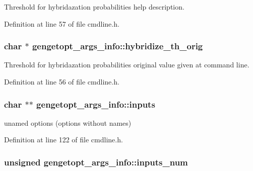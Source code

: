 Threshold for hybridazation probabilities help description. 



Definition at line 57 of file cmdline.\+h.

\hypertarget{structgengetopt__args__info_af5ad30ce558e2a362b45f25eac7c2d8a}{
\subsubsection[{hybridize\+\_\+th\+\_\+orig}]{\setlength{\rightskip}{0pt plus 5cm}char $\ast$ gengetopt\+\_\+args\+\_\+info\+::hybridize\+\_\+th\+\_\+orig}}\label{structgengetopt__args__info_af5ad30ce558e2a362b45f25eac7c2d8a}


Threshold for hybridazation probabilities original value given at command line. 



Definition at line 56 of file cmdline.\+h.

\hypertarget{structgengetopt__args__info_a6fe9c1a32bc4c64a2ca4e3cfce05b147}{
\subsubsection[{inputs}]{\setlength{\rightskip}{0pt plus 5cm}char $\ast$$\ast$ gengetopt\+\_\+args\+\_\+info\+::inputs}}\label{structgengetopt__args__info_a6fe9c1a32bc4c64a2ca4e3cfce05b147}


unamed options (options without names) 



Definition at line 122 of file cmdline.\+h.

\hypertarget{structgengetopt__args__info_a3d69c180d5ac0b1124fd9a6fe680706c}{
\subsubsection[{inputs\+\_\+num}]{\setlength{\rightskip}{0pt plus 5cm}unsigned gengetopt\+\_\+args\+\_\+info\+::inputs\+\_\+num}}\label{structgengetopt__args__info_a3d69c180d5ac0b1124fd9a6fe680706c}


